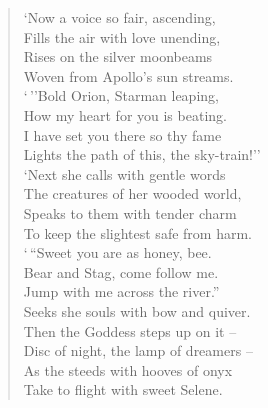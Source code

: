 \begin{footnotesize}
\begin{sffamily}
\begin{verse}
`Now a voice so fair, ascending,\\
Fills the air with love unending,\\
Rises on the silver moonbeams\\
Woven from Apollo's sun streams.\\
`\,''Bold Orion, Starman leaping,\\
How my heart for you is beating.\\
I have set you there so thy fame\\
Lights the path of this, the sky-train!''\\
`Next she calls with gentle words\\
The creatures of her wooded world,\\
Speaks to them with tender charm\\
To keep the slightest safe from harm.\\
`\,``Sweet you are as honey, bee.\\
Bear and Stag, come follow me.\\
Jump with me across the river.''\\
Seeks she souls with bow and quiver.\\
Then the Goddess steps up on it --\\
Disc of night, the lamp of dreamers --\\
As the steeds with hooves of onyx\\
Take to flight with sweet Selene.
\end{verse}

\hfill


\end{sffamily}
\end{footnotesize}
